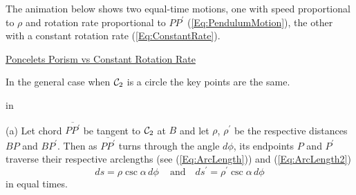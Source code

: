 \documentclass{ximera}
\newcommand{\pskip}{\vskip 0.1 in}
\begin{document}
\begin{exploration}
The animation below shows two equal-time motions, one with speed proportional to $\rho$ and rotation rate proportional to $PP^\prime$ (\ref{Eq:PendulumMotion}), the other with a constant rotation rate (\ref{Eq:ConstantRate}). 
\begin{onlineOnly}
    \begin{center}
\end{center}
\end{onlineOnly}

\href{https://www.desmos.com/calculator/xifdeg3wsq}{Poncelets Porism vs Constant Rotation Rate}

\end{exploration}







In the general case when ${\cal C}_2$ is a circle the key points are the same. %

\pskip

(a) Let chord $\overline{PP^\prime}$ be tangent to ${\cal C}_2$ at $B$ and let $\rho$, $\rho^\prime$ be the respective distances $BP$ and $BP^\prime$. Then as $\overline{PP^\prime}$ turns through the angle $d\phi$, its endpoints $P$ and $P^\prime$ traverse their respective arclengths (see (\ref{Eq:ArcLength})) and (\ref{Eq:ArcLength2})
\begin{equation}
     ds = \rho \csc \alpha \, d\phi \,\,\,\,\, \text{ and } \,\,\,\, ds^\prime = \rho^\prime \csc \alpha \, d\phi  \label{Eq:ArcLengths2}
\end{equation}
in equal times.
\end{document}
